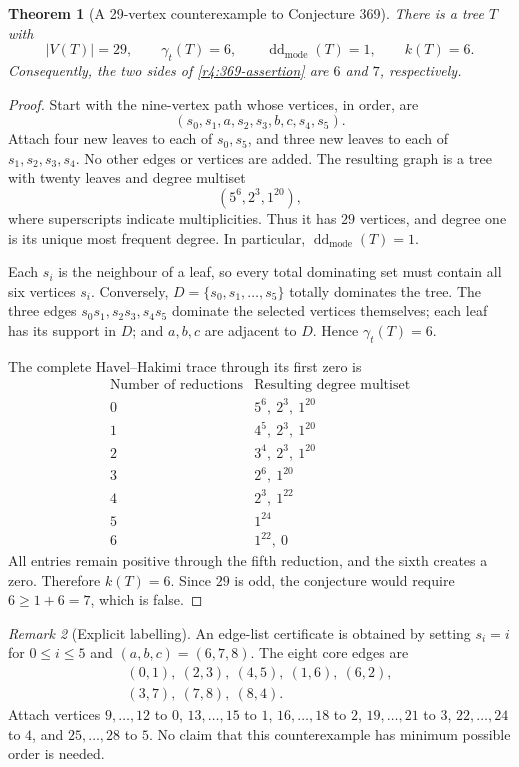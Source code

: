 \documentclass[11pt,a4paper]{article}
\newtheorem{theorem}{Theorem}[section]
\theoremstyle{remark}
\newtheorem{remark}[theorem]{Remark}
\begin{document}
\begin{theorem}[A 29-vertex counterexample to Conjecture 369]
\label{r4:369-finite}
There is a tree $T$ with
\[
  |V(T)|=29,\qquad
  \gamma_t(T)=6,\qquad
  \operatorname{dd}_{\mathrm{mode}}(T)=1,\qquad
  k(T)=6.
\]
Consequently, the two sides of \eqref{r4:369-assertion} are $6$ and $7$,
respectively.
\end{theorem}

\begin{proof}
Start with the nine-vertex path whose vertices, in order, are
\[
  (s_0,s_1,a,s_2,s_3,b,c,s_4,s_5).
\]
Attach four new leaves to each of $s_0,s_5$, and three new leaves to each
of $s_1,s_2,s_3,s_4$.  No other edges or vertices are added.  The resulting
graph is a tree with twenty leaves and degree multiset
\[
  (5^6,2^3,1^{20}),
\]
where superscripts indicate multiplicities.  Thus it has $29$ vertices,
and degree one is its unique most frequent degree.  In particular,
$\operatorname{dd}_{\mathrm{mode}}(T)=1$.

Each $s_i$ is the neighbour of a leaf, so every total dominating set must
contain all six vertices $s_i$.  Conversely,
$D=\{s_0,s_1,\ldots,s_5\}$ totally dominates the tree.  The three edges
$s_0s_1,s_2s_3,s_4s_5$ dominate the selected vertices themselves; each leaf
has its support in $D$; and $a,b,c$ are adjacent to $D$.  Hence
$\gamma_t(T)=6$.

The complete Havel--Hakimi trace through its first zero is
\begin{equation}
\begin{array}{c|l}
  \text{Number of reductions} & \text{Resulting degree multiset}\\ \hline
  0 & 5^6,\ 2^3,\ 1^{20}\\
  1 & 4^5,\ 2^3,\ 1^{20}\\
  2 & 3^4,\ 2^3,\ 1^{20}\\
  3 & 2^6,\ 1^{20}\\
  4 & 2^3,\ 1^{22}\\
  5 & 1^{24}\\
  6 & 1^{22},\ 0
\end{array}
\label{r4:369-trace}
\end{equation}
All entries remain positive through the fifth reduction, and the sixth
creates a zero.  Therefore $k(T)=6$.  Since $29$ is odd, the conjecture
would require $6\ge 1+6=7$, which is false.
\end{proof}

\begin{remark}[Explicit labelling]
\label{r4:369-labelling}
An edge-list certificate is obtained by setting $s_i=i$ for $0\le i\le5$
and $(a,b,c)=(6,7,8)$.  The eight core edges are
\[
\begin{gathered}
  (0,1),\ (2,3),\ (4,5),\ (1,6),\ (6,2),\\
  (3,7),\ (7,8),\ (8,4).
\end{gathered}
\]
Attach vertices $9,\ldots,12$ to $0$, $13,\ldots,15$ to $1$,
$16,\ldots,18$ to $2$, $19,\ldots,21$ to $3$,
$22,\ldots,24$ to $4$, and $25,\ldots,28$ to $5$.
No claim that this counterexample has minimum possible order is needed.
\end{remark}
\end{document}
